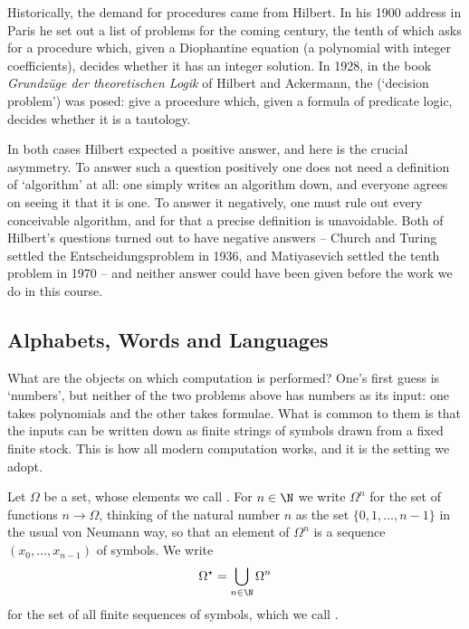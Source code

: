 Historically, the demand for procedures came from Hilbert. In his 1900 address in Paris he set out a list of problems for the coming century, the tenth of which asks for a procedure which, given a Diophantine equation (a polynomial with integer coefficients), decides whether it has an integer solution. In 1928, in the book \emph{Grundz\"uge der theoretischen Logik} of Hilbert and Ackermann, the  (`decision problem') was posed: give a procedure which, given a formula of predicate logic, decides whether it is a tautology.

In both cases Hilbert expected a positive answer, and here is the crucial asymmetry. To answer such a question positively one does not need a definition of `algorithm' at all: one simply writes an algorithm down, and everyone agrees on seeing it that it is one. To answer it negatively, one must rule out every conceivable algorithm, and for that a precise definition is unavoidable. Both of Hilbert's questions turned out to have negative answers -- Church and Turing settled the Entscheidungsproblem in 1936, and Matiyasevich settled the tenth problem in 1970 -- and neither answer could have been given before the work we do in this course.

\subsection{Alphabets, Words and Languages}

What are the objects on which computation is performed? One's first guess is `numbers', but neither of the two problems above has numbers as its input: one takes polynomials and the other takes formulae. What is common to them is that the inputs can be written down as finite strings of symbols drawn from a fixed finite stock. This is how all modern computation works, and it is the setting we adopt.

\begin{definition}[Strings]
	Let $\Omega$ be a set, whose elements we call . For $n \in \N$ we write $\Omega^n$ for the set of functions $n \to \Omega$, thinking of the natural number $n$ as the set $\{0, 1, \dots, n-1\}$ in the usual von Neumann way, so that an element of $\Omega^n$ is a sequence $(x_0, \dots, x_{n-1})$ of symbols. We write
	$$\Omega^\star = \bigcup_{n \in \N} \Omega^n$$
	for the set of all finite sequences of symbols, which we call .
\end{definition}

